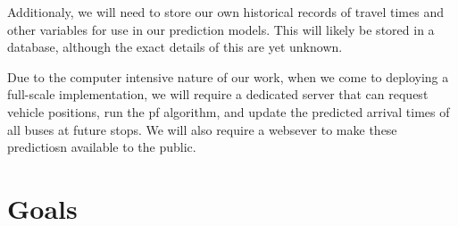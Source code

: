 \documentclass[12pt,a4paper]{article}
\begin{document}
Additionaly, we will need to store our own historical records of travel times and other
variables for use in our prediction models. 
This will likely be stored in a database, although the exact details of this are yet unknown.


Due to the computer intensive nature of our work, 
when we come to deploying a full-scale implementation,
we will require a dedicated server that can request vehicle positions,
run the \gls{pf} algorithm,
and update the predicted arrival times of all buses at future stops.
We will also require a websever to make these predictiosn available to the public.





\section{Goals}












\end{document}
